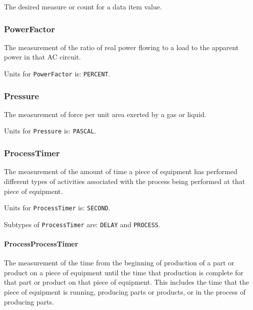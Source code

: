 The desired measure or count for a data item value.


\subsubsection{PowerFactor}
\label{sec:PowerFactor}



The measurement of the ratio of real power flowing to a load to the apparent power in that AC circuit.


Units for \texttt{PowerFactor} is: \texttt{PERCENT}.

\FloatBarrier

\subsubsection{Pressure}
\label{sec:Pressure}



The measurement of force per unit area exerted by a gas or liquid.


Units for \texttt{Pressure} is: \texttt{PASCAL}.

\FloatBarrier

\subsubsection{ProcessTimer}
\label{sec:ProcessTimer}



The measurement of the amount of time a piece of equipment has performed different types of activities associated with the process being performed at that piece of equipment.


Units for \texttt{ProcessTimer} is: \texttt{SECOND}.


Subtypes of \texttt{ProcessTimer} are: \texttt{DELAY} and \texttt{PROCESS}. 
\FloatBarrier

\paragraph{ProcessProcessTimer}\mbox{}
\label{sec:ProcessProcessTimer}



The measurement of the time from the beginning of production of a part or product on a piece of equipment until the time that production is complete for that part or product on that piece of equipment.  This includes the time that the piece of equipment is running, producing parts or products, or in the process of producing parts.


